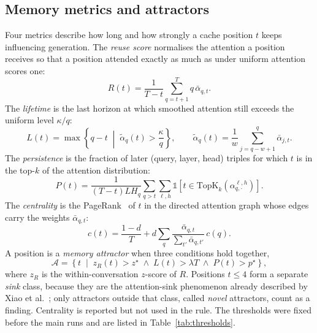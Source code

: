 \subsection{Memory metrics and attractors}
Four metrics describe how long and how strongly a cache position $t$ keeps influencing generation. The \emph{reuse score} normalises the attention a position receives so that a position attended exactly as much as under uniform attention scores one:
\begin{equation}
R(t) = \frac{1}{T - t}\sum_{q=t+1}^{T} q\,\bar\alpha_{q,t}.
\end{equation}
The \emph{lifetime} is the last horizon at which smoothed attention still exceeds the uniform level $\kappa / q$:
\begin{equation}
L(t) = \max\left\{ q - t \;\middle|\; \tilde\alpha_q(t) > \frac{\kappa}{q} \right\}, \qquad \tilde\alpha_q(t) = \frac{1}{w}\sum_{j=q-w+1}^{q}\bar\alpha_{j,t}.
\end{equation}
The \emph{persistence} is the fraction of later (query, layer, head) triples for which $t$ is in the top-$k$ of the attention distribution:
\begin{equation}
P(t) = \frac{1}{(T - t) L H_q}\sum_{q>t}\sum_{\ell,h}\mathbb{1}\!\left[t \in \mathrm{TopK}_k\!\left(\alpha^{\ell,h}_{q,\cdot}\right)\right].
\end{equation}
The \emph{centrality} is the PageRank~\cite{page1999pagerank} of $t$ in the directed attention graph whose edges carry the weights $\bar\alpha_{q,t}$:
\begin{equation}
c(t) = \frac{1 - d}{T} + d\sum_{q}\frac{\bar\alpha_{q,t}}{\sum_{t'}\bar\alpha_{q,t'}}\,c(q).
\end{equation}
A position is a \emph{memory attractor} when three conditions hold together,
\begin{equation}
\mathcal{A} = \left\{ t \;\middle|\; z_R(t) > z^\star \;\wedge\; L(t) > \lambda T \;\wedge\; P(t) > p^\star \right\},
\end{equation}
where $z_R$ is the within-conversation $z$-score of $R$. Positions $t \le 4$ form a separate \emph{sink} class, because they are the attention-sink phenomenon already described by Xiao et al.~\cite{xiao2024sinks}; only attractors outside that class, called \emph{novel} attractors, count as a finding. Centrality is reported but not used in the rule. The thresholds were fixed before the main runs and are listed in Table~\ref{tab:thresholds}.

